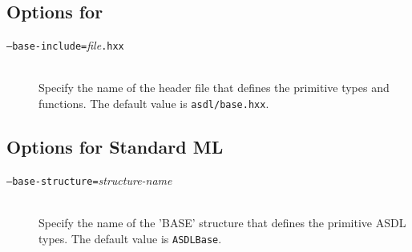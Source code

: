 \subsection*{Options for \Cplusplus}

\begin{description}
  \item[\normalfont\texttt{--base-include=}\textit{file}\texttt{.hxx}] \mbox{}\\
    Specify the name of the \Cplusplus{}header file that defines the primitive \asdl{} types
    and functions.
    The default value is \texttt{asdl/base.hxx}.
\end{description}%

\subsection*{Options for Standard ML}
\begin{description}
  \item[\normalfont\texttt{--base-structure=}\textit{structure-name}] \mbox{}\\
    Specify the name of the 'BASE' structure that defines the primitive ASDL types.
    The default value is \lstinline[language=SML]!ASDLBase!.
\end{description}%

